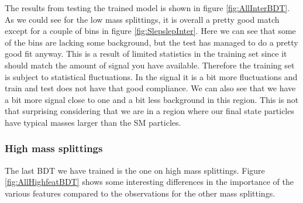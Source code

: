 The results from testing the trained model is shown in figure \ref{fig:AllInterBDT}. As we could see for the low mass splittings, it is overall a pretty good match except for a couple of bins in figure \ref{fig:SlepslepInter}. Here we can see that some of the bins are lacking some background, but the test has managed to do a pretty good fit anyway. This is a result of limited statistics in the training set since it should match the amount of signal you have available. Therefore the training set is subject to statistical fluctuations. In the signal it is a bit more fluctuations and train and test does not have that good compliance. We can also see that we have a bit more signal close to one and a bit less background in this region. This is not that surprising considering that we are in a region where our final state particles have typical masses larger than the SM particles. 
















\subsubsection{High mass splittings}

The last BDT we have trained is the one on high mass splittings. Figure \ref{fig:AllHighfeatBDT} shows some interesting differences in the importance of the various features compared to the observations for the other mass splittings.

